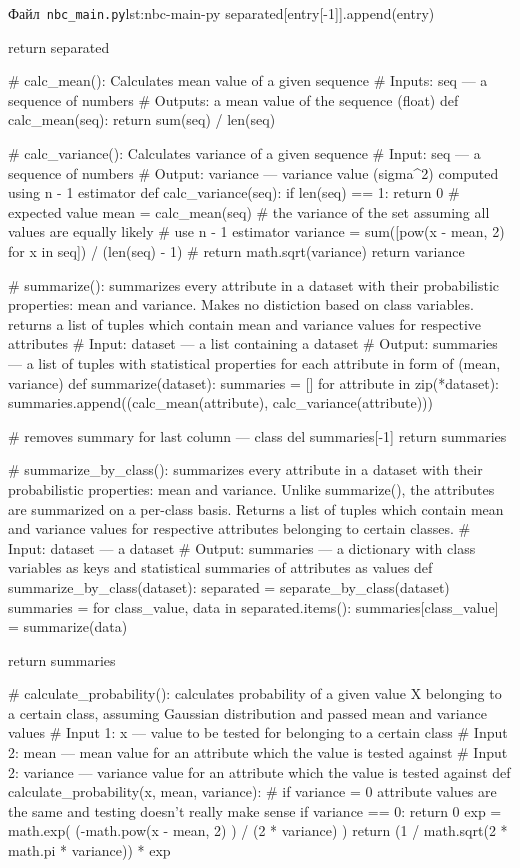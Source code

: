 \documentclass[
	a4paper,
	oneside,
	DIV = 12,
	fontsize = 13pt,
	headings = normal,
	numbers = endperiod,
	bibliography = totoc, %
]{scrartcl}
\theoremstyle{mythm}
\newcommand{\filename}[1]{\texttt{#1}}
\begin{document}
\begin{listingpython}[toprule = 0pt, bottomrule = 0pt]{Файл~\filename{nbc\_main.py}}{lst:nbc-main-py}
        separated[entry[-1]].append(entry)

    return separated

# calc_mean(): Calculates mean value of a given sequence
# Inputs: seq — a sequence of numbers
# Outputs: a mean value of the sequence (float)
def calc_mean(seq):
    return sum(seq) / len(seq)

# calc_variance(): Calculates variance of a given sequence
# Input: seq --- a sequence of numbers
# Output: variance --- variance value (sigma^2) computed using n - 1 estimator
def calc_variance(seq):
    if len(seq) == 1:
        return 0
    # expected value
    mean = calc_mean(seq)
    # the variance of the set assuming all values are equally likely
    # use n - 1 estimator
    variance = sum([pow(x - mean, 2) for x in seq]) / (len(seq) - 1)
    # return math.sqrt(variance)
    return variance

# summarize(): summarizes every attribute in a dataset with their probabilistic properties: mean and variance. Makes no distiction based on class variables. returns a list of tuples which contain mean and variance values for respective attributes
# Input: dataset --- a list containing a dataset
# Output: summaries --- a list of tuples with statistical properties for each attribute in form of (mean, variance)
def summarize(dataset):
    summaries = []
    for attribute in zip(*dataset):
        summaries.append((calc_mean(attribute), calc_variance(attribute)))

    # removes summary for last column — class
    del summaries[-1]
    return summaries

# summarize_by_class(): summarizes every attribute in a dataset with their probabilistic properties: mean and variance. Unlike summarize(), the attributes are summarized on a per-class basis. Returns a list of tuples which contain mean and variance values for respective attributes belonging to certain classes.
# Input: dataset --- a dataset
# Output: summaries --- a dictionary with class variables as keys and statistical summaries of attributes as values
def summarize_by_class(dataset):
    separated = separate_by_class(dataset)
    summaries = {}
    for class_value, data in separated.items():
        summaries[class_value] = summarize(data)

    return summaries

# calculate_probability(): calculates probability of a given value X belonging to a certain class, assuming Gaussian distribution and passed mean and variance values
# Input 1: x --- value to be tested for belonging to a certain class
# Input 2: mean --- mean value for an attribute which the value is tested against
# Input 2: variance --- variance value for an attribute which the value is tested against
def calculate_probability(x, mean, variance):
    # if variance = 0 attribute values are the same and testing doesn't really make sense
    if variance == 0:
        return 0
    exp = math.exp( (-math.pow(x - mean, 2) ) / (2 * variance) )
    return (1 / math.sqrt(2 * math.pi * variance)) * exp


\end{listingpython}
\end{document}
